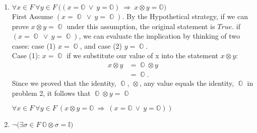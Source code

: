 \documentclass[11pt]{article}
\numberwithin{equation}{section}
\DeclareMathOperator*{\OO}{\mathbb{O}}
\DeclareMathOperator*{\+}{\oplus}
\DeclareMathOperator*{\x}{\otimes}
\begin{document}
\begin{enumerate}[label= 1.\arabic*), itemsep=0.4cm]
  \item %
    $\forall x \in F \ \forall y \in F \ \Big ( (x = \mathbb{O} \ \lor \ y = \mathbb{O})  \ \Rightarrow \ x \otimes y = \mathbb{O} \Big ) $\\
 First Assume $(x = \OO \ \lor \ y = \OO)$. By the Hypothetical strategy, if we can prove $x \x y = \OO$ under this assumption, the original statement is $True$. if $(x = \OO \ \lor \ y = \OO)$, we can evaluate the implication by thinking of two cases: case (1) $x = \OO$, and case (2) $y = \OO$.\\
 Case (1): $x = \OO$ if we substitute our value of x into the statement $x \x y$:
 \begin{align*}
   x \x y &= \OO \x y \\
          &= \OO.
 \end{align*}
Since we proved that the identity, $\OO$, $\x$, any value equals the identity, $\OO$ in problem 2, it follows that $\OO \x y = \OO$ 

    $\forall x \in F \ \forall y \in F \ (x \otimes y = \mathbb{O}   \ \Rightarrow \ (x = \mathbb{O} \ \lor \ y = \mathbb{O}))$
  \item %
    $\neg \Big ( \exists \sigma \in F \ \mathbb{O} \otimes \sigma= \mathbb{I} \Big ) $
\end{enumerate}
\end{document}
